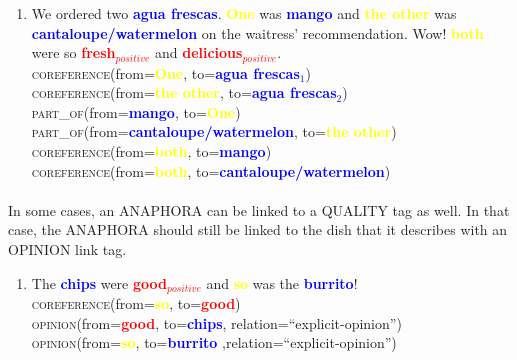 \documentclass{article}
\begin{document}
\begin{enumerate}[resume]
\item We ordered two \textbf{\textcolor{blue}{agua frescas}}. \textbf{\textcolor{yellow}{One}} was  \textbf{\textcolor{blue}{mango}} and \textbf{\textcolor{yellow}{the other}} was 
\textbf{\textcolor{blue}{cantaloupe/watermelon}} on the waitress' recommendation. Wow! 
\textbf{\textcolor{yellow}{both}} were so 
\textbf{\textcolor{red}{fresh$_{positive}$}} and 
\textbf{\textcolor{red}{delicious$_{positive}$}}.\\
\textsc{coreference}(from=\textbf{\textcolor{yellow}{One}}, to=\textbf{\textcolor{blue}{agua frescas$_{1}$}}) \\
\textsc{coreference}(from=\textbf{\textcolor{yellow}{the other}}, to=\textbf{\textcolor{blue}{agua frescas$_{2}$}}) \\
\textsc{part\_of}(from=\textbf{\textcolor{blue}{mango}}, to=\textbf{\textcolor{yellow}{One}})\\
\textsc{part\_of}(from=\textbf{\textcolor{blue}{cantaloupe/watermelon}}, to=\textbf{\textcolor{yellow}{the other}})\\
\textsc{coreference}(from=\textbf{\textcolor{yellow}{both}}, to=\textbf{\textcolor{blue}{mango}}) \\
\textsc{coreference}(from=\textbf{\textcolor{yellow}{both}}, to=\textbf{\textcolor{blue}{cantaloupe/watermelon}}) 
\end{enumerate}

\paragraph{}
In some cases, an ANAPHORA can be linked to a QUALITY tag as well. In that case, the ANAPHORA should still be linked to the dish that it describes with an OPINION link tag.
\begin{enumerate}[resume]
\item The \textbf{\textcolor{blue}{chips}} were \textbf{\textcolor{red}{good$_{positive}$}} and \textbf{\textcolor{yellow}{so}} was the \textbf{\textcolor{blue}{burrito}}!\\
\textsc{coreference}(from=\textbf{\textcolor{yellow}{so}}, to=\textbf{\textcolor{red}{good}}) \\
\textsc{opinion}(from=\textbf{\textcolor{red}{good}}, to=\textbf{\textcolor{blue}{chips}}, relation=``explicit-opinion'') \\
\textsc{opinion}(from=\textbf{\textcolor{yellow}{so}}, to=\textbf{\textcolor{blue}{burrito}} ,relation=``explicit-opinion'') 
\end{enumerate}
\end{document}
